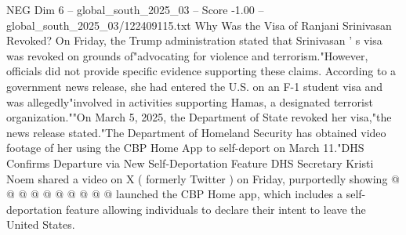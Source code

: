 \begin{textsample}{NEG Dim 6 – global\_south\_2025\_03 – Score -1.00 – global\_south\_2025\_03/122409115.txt}
Why Was the Visa of Ranjani Srinivasan Revoked?
On Friday, the Trump administration stated that Srinivasan ' s visa was revoked on grounds of"advocating for violence and terrorism."However, officials did not provide specific evidence supporting these claims.
According to a government news release, she had entered the U.S. on an F-1 student visa and was allegedly"involved in activities supporting Hamas, a designated terrorist organization.""On March 5, 2025, the Department of State revoked her visa,"the news release stated."The Department of Homeland Security has obtained video footage of her using the CBP Home App to self-deport on March 11."DHS Confirms Departure via New Self-Deportation Feature DHS Secretary Kristi Noem shared a video on X ( formerly Twitter ) on Friday, purportedly showing @ @ @ @ @ @ @ @ @ @ launched the CBP Home app, which includes a self-deportation feature allowing individuals to declare their intent to leave the United States.

\end{textsample}
